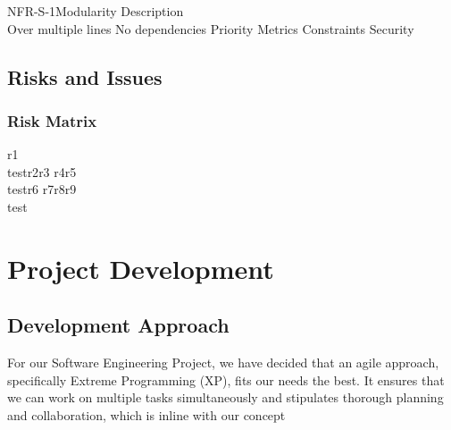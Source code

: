 \documentclass[coverpage,lineno]{../custom}
\begin{document}
\NonFunctionalReqS
{NFR-S-1}{Modularity}
{Description\\Over multiple lines}
{No dependencies}
{Priority}
{Metrics}
{Constraints}
{Security}

\subsection{Risks and Issues}
\label{ssec:risks}

\subsubsection{Risk Matrix}

\RiskMatrix
{r1\\test}{r2}{r3}
{r4}{r5\\test}{r6}
{r7}{r8}{r9\\test}

\section{Project Development}
\label{sec:dev}

\subsection{Development Approach}
\label{ssec:dev_approach}
For our Software Engineering Project, we have decided that an agile approach, specifically Extreme Programming (XP), fits our needs the best. It ensures that we can work on multiple tasks simultaneously and stipulates thorough planning and collaboration, which is inline with our concept
\end{document}
